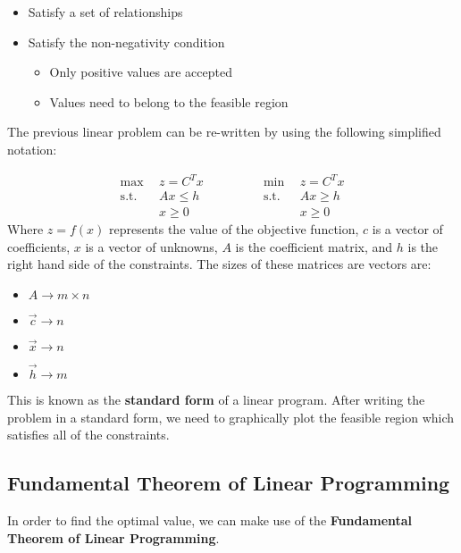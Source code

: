 \documentclass{article}
\begin{document}
\begin{itemize}
	\item Satisfy a set of relationships
	\item Satisfy the non-negativity condition
	\begin{itemize}
		\item Only positive values are accepted
		\item Values need to belong to the feasible region
	\end{itemize}
\end{itemize}
The previous linear problem can be re-written by using the following simplified notation:

\begin{equation*}
  \begin{split}
    \max~~ & z = C^Tx \\
	\text{s.t.}~~ & Ax \leq h \\
	~~& x \geq 0
  \end{split}
\quad\quad\quad\quad
  \begin{split}
    \min~~ & z = C^Tx \\
	\text{s.t.}~~ & Ax \geq h \\
	~~& x \geq 0
  \end{split}
\end{equation*}
Where $z = f(x)$ represents the value of the objective function, $c$ is a vector of coefficients, $x$ is a vector of unknowns, $A$ is the coefficient matrix, and $h$ is the right hand side of the constraints. The sizes of these matrices are vectors are:

\begin{itemize}
	\item $A \rightarrow m \times n$
	\item $\overrightarrow{c} \rightarrow n$
	\item $\overrightarrow{x} \rightarrow n$
	\item $\overrightarrow{h} \rightarrow m$
\end{itemize}
This is known as the \textbf{standard form} of a linear program. After writing the problem in a standard form, we need to graphically plot the feasible region which satisfies all of the constraints.

\subsection{Fundamental Theorem of Linear Programming}
In order to find the optimal value, we can make use of the \textbf{Fundamental Theorem of Linear Programming}.
\end{document}
